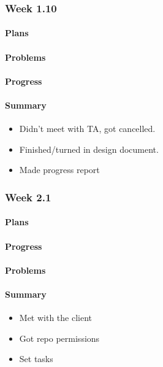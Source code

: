 \documentclass[onecolumn, draftclsnofoot,10pt, compsoc]{article}
\begin{document}
		\subsubsection{Week 1.10}

		    \paragraph{Plans} \hfill \break

		    \paragraph{Problems} \hfill \break

		    \paragraph{Progress} \hfill \break

		    \paragraph{Summary} \hfill \break
		        \begin{itemize}
                    \item Didn't meet with TA, got cancelled.
                    \item Finished/turned in design document.
                    \item Made progress report
                \end{itemize}

		  \subsubsection{Week 2.1}
			\paragraph{Plans} \hfill \break


			\paragraph{Progress} \hfill \break

			\paragraph{Problems} \hfill \break


			\paragraph{Summary} \hfill \break
			    \begin{itemize}
                    \item Met with the client
                    \item Got repo permissions
                    \item Set tasks
                \end{itemize}
\end{document}
